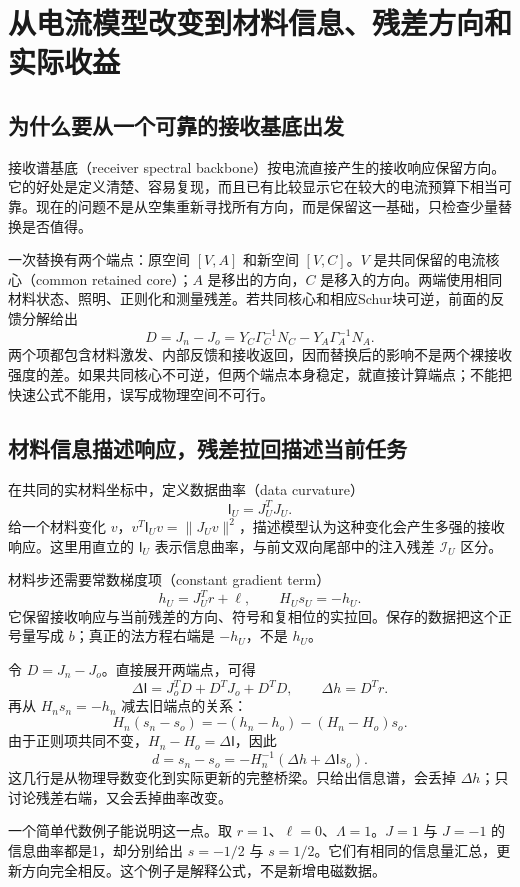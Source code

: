 \section{从电流模型改变到材料信息、残差方向和实际收益}
\subsection{为什么要从一个可靠的接收基底出发}
接收谱基底（receiver spectral backbone）按电流直接产生的接收响应保留方向。它的好处是定义清楚、容易复现，而且已有比较显示它在较大的电流预算下相当可靠。现在的问题不是从空集重新寻找所有方向，而是保留这一基础，只检查少量替换是否值得。

一次替换有两个端点：原空间 $[V,A]$ 和新空间 $[V,C]$。$V$ 是共同保留的电流核心（common retained core）；$A$ 是移出的方向，$C$ 是移入的方向。两端使用相同材料状态、照明、正则化和测量残差。若共同核心和相应Schur块可逆，前面的反馈分解给出
\[
 D=J_n-J_o=Y_C\Gamma_C^{-1}N_C-Y_A\Gamma_A^{-1}N_A.
\]
两个项都包含材料激发、内部反馈和接收返回，因而替换后的影响不是两个裸接收强度的差。如果共同核心不可逆，但两个端点本身稳定，就直接计算端点；不能把快速公式不能用，误写成物理空间不可行。

\subsection{材料信息描述响应，残差拉回描述当前任务}
在共同的实材料坐标中，定义数据曲率（data curvature）
\[
 \mathsf I_U=J_U^TJ_U.
\]
给一个材料变化 $v$，$v^T\mathsf I_Uv=\|J_Uv\|^2$，描述模型认为这种变化会产生多强的接收响应。这里用直立的 $\mathsf I_U$ 表示信息曲率，与前文双向尾部中的注入残差 $\mathcal I_U$ 区分。

材料步还需要常数梯度项（constant gradient term）
\[
 h_U=J_U^Tr+\ell,\qquad H_Us_U=-h_U.
\]
它保留接收响应与当前残差的方向、符号和复相位的实拉回。保存的数据把这个正号量写成 $b$；真正的法方程右端是 $-h_U$，不是 $h_U$。

令 $D=J_n-J_o$。直接展开两端点，可得
\[
 \Delta\mathsf I=J_o^TD+D^TJ_o+D^TD,
 \qquad \Delta h=D^Tr.
\]
再从 $H_ns_n=-h_n$ 减去旧端点的关系：
\[
 H_n(s_n-s_o)=-(h_n-h_o)-(H_n-H_o)s_o.
\]
由于正则项共同不变，$H_n-H_o=\Delta\mathsf I$，因此
\[
 \boxed{d=s_n-s_o=-H_n^{-1}(\Delta h+\Delta\mathsf I s_o).}
\]
这几行是从物理导数变化到实际更新的完整桥梁。只给出信息谱，会丢掉 $\Delta h$；只讨论残差右端，又会丢掉曲率改变。

一个简单代数例子能说明这一点。取 $r=1$、$\ell=0$、$\Lambda=1$。$J=1$ 与 $J=-1$ 的信息曲率都是1，却分别给出 $s=-1/2$ 与 $s=1/2$。它们有相同的信息量汇总，更新方向完全相反。这个例子是解释公式，不是新增电磁数据。


